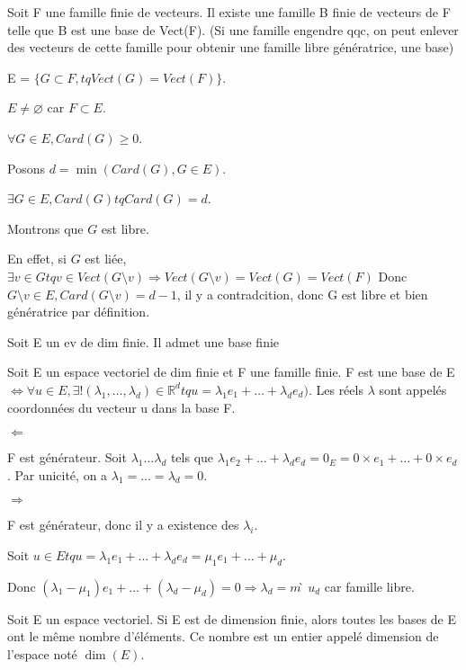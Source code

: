 \documentclass[french]{yLectureNote}
\newcommand{\R}[0]{\mathbb{R}}
\begin{document}
\begin{proposition}
Soit F une famille finie de vecteurs. Il existe une famille B finie de vecteurs de F telle que B est une base de Vect(F). (Si une famille engendre qqc, on peut enlever des vecteurs de cette famille pour obtenir une famille libre génératrice, une base)
\end{proposition}
\begin{myproof}
E = $\{G\subset F, tq Vect(G) = Vect(F)\}$.

$E\neq \varnothing$ car $F\subset E$.

$\forall G\in E, Card(G) \geq 0$.

Posons $d = \min(Card(G), G\in E)$.

$\exists G \in E, Card(G) tq Card(G) = d$.

Montrons que $G$ est libre.

En effet, si $G$ est liée, $\exists v\in G tq v\in Vect(G\setminus v) \Rightarrow Vect(G\setminus v) = Vect(G) = Vect(F)$ Donc $G\setminus v \in E , Card(G\setminus v) = d-1$, il y a contradcition, donc G est libre et bien génératrice par définition.
\end{myproof}
\begin{proposition}
Soit E un ev de dim finie. Il admet une base finie
\end{proposition}
\begin{theorem}[Coordonnées]
 Soit E un espace vectoriel de dim finie et F une famille finie. F est une base de E \(\iff \forall u\in E, \exists! (\lambda_1,\dots,\lambda_d)\in \R^d tq u = \lambda_1e_1+\dots+\lambda_de_d)\). Les réels \(\lambda\) sont appelés coordonnées du vecteur u dans la base F.
\end{theorem}
\begin{myproof}
\(\Leftarrow\)

F est générateur. Soit $\lambda_1\dots\lambda_d$ tels que $\lambda_1e_2+\dots+\lambda_de_d = 0_E = 0\times e_1+\dots+0\times e_d$. Par unicité, on a $\lambda_1=\dots=\lambda_d = 0$.


$\Rightarrow$

F est générateur, donc il y a existence des $\lambda_i$.

Soit $u \in E tq u = \lambda_1e_1+\dots+\lambda_de_d = \mu_1e_1+\dots+\mu_d$.

Donc $(\lambda_1-\mu_1)e_1+\dots+(\lambda_d-\mu_d) = 0 \Rightarrow \lambda_d = m̀u_d$ car famille libre.
\end{myproof}
\begin{theorem}[Dimension]
 Soit E un espace vectoriel. Si E est de dimension finie, alors toutes les bases de E ont le m\^eme nombre d'éléments. Ce nombre est un entier appelé dimension de l'espace noté $\dim(E)$.
\end{theorem}
\end{document}
